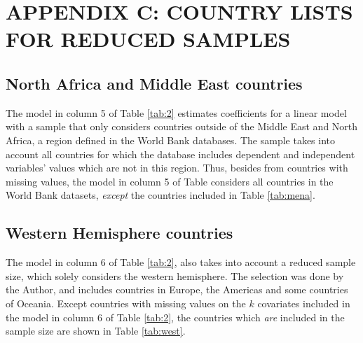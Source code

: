 \documentclass[../main.tex]{subfiles}
\begin{document}
\section{APPENDIX C: COUNTRY LISTS FOR REDUCED SAMPLES}
\label{sec:C}
\subsection{North Africa and Middle East countries}
The model in column 5 of Table \ref{tab:2} estimates coefficients for a linear model with a sample that only considers countries outside of the Middle East and North Africa, a region defined in the World Bank databases. The sample takes into account all countries for which the database includes dependent and independent variables' values which are not in this region. Thus, besides from countries with missing values, the model in column 5 of Table considers all countries in the World Bank datasets, \emph{except} the countries included in Table \ref{tab:mena}.
\subsection{Western Hemisphere countries}
The model in column 6 of Table \ref{tab:2}, also takes into account a reduced sample size, which solely considers the western hemisphere. The selection was done by the Author, and includes countries in Europe, the Americas and some countries of Oceania. Except countries with missing values on the $k$ covariates included in the model in column 6 of Table \ref{tab:2}, the countries which \emph{are} included in the sample size are shown in Table \ref{tab:west}.
\end{document}
